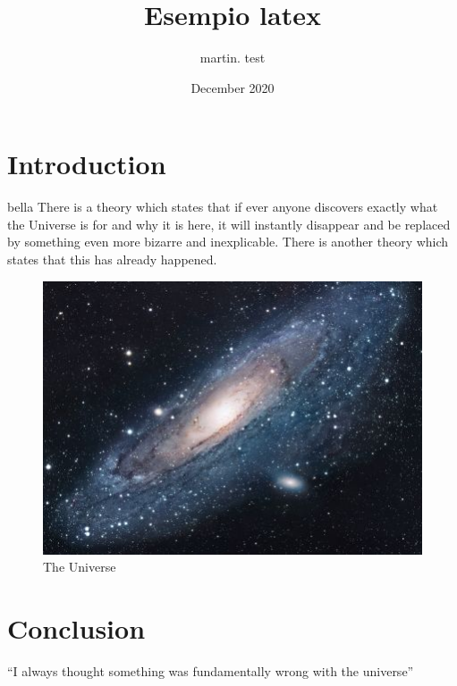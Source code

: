 \documentclass{article}
\title{Esempio latex}
\author{martin. test }
\date{December 2020}
\begin{document}
\maketitle

\section{Introduction}
bella There is a theory which states that if ever anyone discovers exactly what the Universe is for and why it is here, it will instantly disappear and be replaced by something even more bizarre and inexplicable.
There is another theory which states that this has already happened.

\begin{figure}[h!]
\centering
\includegraphics[scale=1.7]{universe}
\caption{The Universe}
\label{fig:universe}
\end{figure}

\section{Conclusion}
``I always thought something was fundamentally wrong with the universe'' \citep{adams1995hitchhiker}



\end{document}
